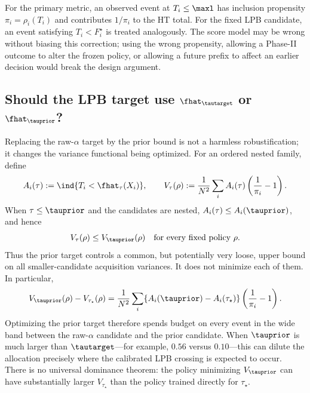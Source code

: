 For the primary metric, an observed event at $T_i\leq\maxl$ has inclusion
propensity $\pi_i=\rho_i(T_i)$ and contributes $1/\pi_i$ to the HT total.  For
the fixed LPB candidate, an event satisfying $T_i<F_i^\star$ is treated
analogously.  The score model may be wrong without biasing this correction;
using the wrong propensity, allowing a Phase-II outcome to alter the frozen
policy, or allowing a future prefix to affect an earlier decision would break
the design argument.

\subsection{Should the LPB target use $\fhat_{\tautarget}$ or
$\fhat_{\tauprior}$?}
\label{sec:spgd_alpha_vs_prior}

Replacing the raw-$\alpha$ target by the prior bound is not a harmless
robustification; it changes the variance functional being optimized.  For an
ordered nested family, define
\begin{equation}
    A_i(\tau):=\ind{T_i<\fhat_\tau(X_i)},
    \qquad
    V_\tau(\rho):=\frac{1}{N^2}\sum_i
       A_i(\tau)\left(\frac{1}{\pi_i}-1\right).
\end{equation}
When $\tau\leq\tauprior$ and the candidates are nested,
$A_i(\tau)\leq A_i(\tauprior)$, and hence
\begin{equation}
    V_\tau(\rho)\leq V_{\tauprior}(\rho)
    \quad\text{for every fixed policy }\rho.
    \label{eq:spgd_prior_upper_bound}
\end{equation}
Thus the prior target controls a common, but potentially very loose, upper
bound on all smaller-candidate acquisition variances.  It does not minimize
each of them.  In particular,
\begin{equation}
    V_{\tauprior}(\rho)-V_{\tau_\star}(\rho)
    =\frac{1}{N^2}\sum_i
      \{A_i(\tauprior)-A_i(\tau_\star)\}
      \left(\frac{1}{\pi_i}-1\right).
    \label{eq:spgd_prior_band_cost}
\end{equation}
Optimizing the prior target therefore spends budget on every event in the
wide band between the raw-$\alpha$ candidate and the prior candidate.  When
$\tauprior$ is much larger than $\tautarget$---for example, $0.56$ versus
$0.10$---this can dilute the allocation precisely where the calibrated LPB
crossing is expected to occur.  There is no universal dominance theorem:
the policy minimizing $V_{\tauprior}$ can have substantially larger
$V_{\tau_\star}$ than the policy trained directly for $\tau_\star$.

